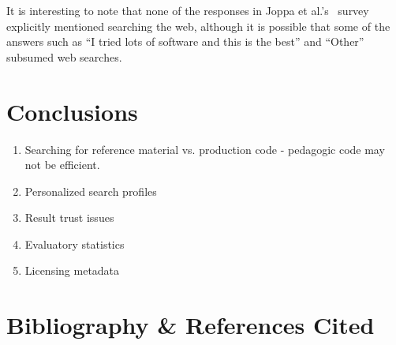 \documentclass{casicswhitepaper}
\begin{document}
It is interesting to note that none of the responses in Joppa et al.'s~\cite{joppa2013troubling} survey explicitly mentioned searching the web, although it is possible that some of the answers such as ``I tried lots of software and this is the best'' and ``Other'' subsumed web searches.





\section{Conclusions}

\begin{enumerate}
\item Searching for reference material vs. production code - pedagogic code may not be efficient.
\item Personalized search profiles
\item Result trust issues
\item Evaluatory statistics 
\item Licensing metadata
\end{enumerate}

\clearpage
\section*{Bibliography \& References Cited}
\renewcommand{\refname}{}               %
\vspace*{-2ex}


\end{document}
